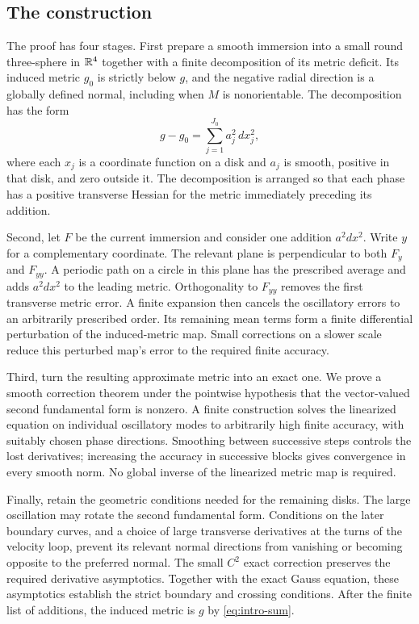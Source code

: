 \subsection{The construction}
The proof has four stages. First prepare a smooth immersion into a small round
three-sphere in $\mathbb{R}^4$ together with a finite decomposition of its metric
deficit. Its induced metric $g_0$ is strictly below $g$, and the negative
radial direction is a globally defined normal, including when $M$ is
nonorientable. The decomposition has the form
\begin{equation}\label{eq:intro-sum}
 g-g_0=\sum_{j=1}^{J_0} a_j^2\,dx_j^2,
\end{equation}
where each $x_j$ is a coordinate function on a disk and $a_j$ is smooth,
positive in that disk, and zero outside it. The decomposition is arranged so
that each phase has a positive transverse Hessian for the metric immediately
preceding its addition.

Second, let $F$ be the current immersion and consider one addition
$a^2dx^2$. Write $y$ for a complementary coordinate. The relevant plane is
perpendicular to both $F_y$ and $F_{yy}$.
A periodic path on a circle in this plane has the prescribed average and
adds $a^2dx^2$ to the leading metric. Orthogonality to $F_{yy}$ removes
the first transverse metric error. A finite expansion then cancels the
oscillatory errors to an arbitrarily prescribed order. Its remaining mean
terms form a finite differential perturbation of the induced-metric map.
Small corrections on a slower scale reduce this perturbed map's error to
the required finite accuracy.

Third, turn the resulting approximate metric into an exact one. We prove a
smooth correction theorem under the pointwise hypothesis that the
vector-valued second fundamental form is nonzero. A finite construction solves
the linearized equation on individual oscillatory modes to arbitrarily high
finite accuracy, with suitably chosen phase directions.
Smoothing between successive steps controls the lost derivatives; increasing
the accuracy in successive blocks gives convergence in every smooth norm.
No global inverse of the linearized metric map is required.

Finally, retain the geometric conditions needed for the remaining disks.
The large oscillation may rotate the second fundamental form. Conditions on
the later boundary curves, and a choice of large transverse derivatives at the
turns of the velocity loop, prevent its relevant normal directions from
vanishing or becoming opposite to the preferred normal. The small $C^2$ exact correction preserves the
required derivative asymptotics. Together with the exact Gauss equation,
these asymptotics establish the strict boundary and crossing conditions.
After the finite list of additions, the induced metric is $g$ by
\eqref{eq:intro-sum}.

